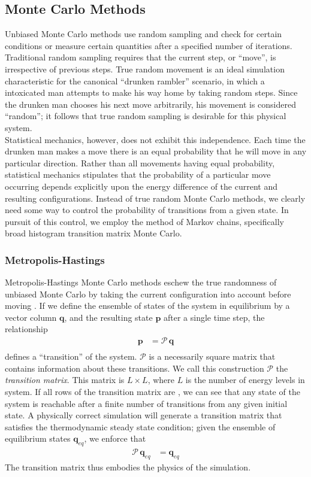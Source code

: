 \documentclass[12pt]{article}
\begin{document}
\subsection{Monte Carlo Methods}

Unbiased Monte Carlo methods use random sampling and check for certain conditions or measure certain quantities after a specified number of iterations. Traditional random sampling requires that the current step, or ``move'', is irrespective of previous steps. True random movement is an ideal simulation characteristic for the canonical ``drunken rambler'' scenario, in which a intoxicated man attempts to make his way home by taking random steps. Since the drunken man chooses his next move arbitrarily, his movement is considered ``random''; it follows that true random sampling is desirable for this physical system. \\

Statistical mechanics, however, does not exhibit this independence. Each time the drunken man makes a move there is an equal probability that he will move in any particular direction. Rather than all movements having equal probability, statistical mechanics stipulates that the probability of a particular move occurring depends explicitly upon the energy difference of the current and resulting configurations. Instead of true random Monte Carlo methods, we clearly need some way to control the probability of transitions from a given state. In pursuit of this control, we employ the method of Markov chains, specifically broad histogram transition matrix Monte Carlo.
\subsubsection{Metropolis-Hastings}
Metropolis-Hastings Monte Carlo methods eschew the true randomness of unbiased Monte Carlo by taking the current configuration into account before moving \cite{metro-hastings}. If we define the ensemble of states of the system in equilibrium by a vector column $\mathbf{q}$, and the resulting state $\mathbf{p}$ after a single time step, the relationship
\begin{align*}
    \mathbf{p} &= \mathcal{P}\, \mathbf{q}\\
\end{align*}
defines a ``transition'' of the system. $\mathcal{P}$ is a necessarily square matrix that contains information about these transitions. We call this construction $\mathcal{P}$ the {\it transition matrix}. This matrix is $L\times L$, where $L$ is the number of energy levels in system. If all rows of the transition matrix are , we can see that any state of the system is reachable after a finite number of transitions from any given initial state. A physically correct simulation will generate a transition matrix that satisfies the thermodynamic steady state condition; given the ensemble of equilibrium states $\mathbf{q}_{eq}$, we enforce that
\begin{align}
    \mathcal{P}\,\mathbf{q}_{eq} &= \mathbf{q}_{eq}
    \label{thermo-steady-state}
\end{align}
The transition matrix thus embodies the physics of the simulation.
\end{document}
